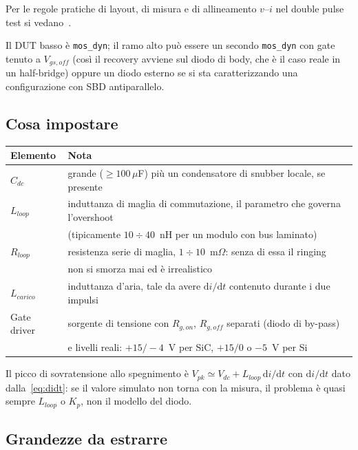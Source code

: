 \documentclass[11pt,a4paper]{article}
\newcommand{\ssc}[1]{\texttt{#1}}
\newcommand{\ud}{\mathrm{d}}
\begin{document}
Per le regole pratiche di layout, di misura e di allineamento $v$--$i$ nel
double pulse test si vedano~\cite{Zhang2017,Levett2020}.

Il DUT basso è \ssc{mos\_dyn}; il ramo alto può essere un secondo
\ssc{mos\_dyn} con gate tenuto a $V_{gs,off}$ (così il recovery avviene sul
diodo di body, che è il caso reale in un half-bridge) oppure un diodo esterno
se si sta caratterizzando una configurazione con SBD antiparallelo.

\subsection{Cosa impostare}

\begin{center}
\begin{tabular}{ll}
\toprule
Elemento & Nota \\
\midrule
$C_{dc}$      & grande ($\ge100\,\mu$F) più un condensatore di snubber locale, se presente \\
$L_{loop}$    & induttanza di maglia di commutazione, il parametro che governa l'overshoot \\
              & (tipicamente $10\div40$~nH per un modulo con bus laminato) \\
$R_{loop}$    & resistenza serie di maglia, $1\div10$~m$\Omega$: senza di essa il ringing \\
              & non si smorza mai ed è irrealistico \\
$L_{carico}$  & induttanza d'aria, tale da avere $\ud i/\ud t$ contenuto durante i due impulsi \\
Gate driver   & sorgente di tensione con $R_{g,on}$, $R_{g,off}$ separati (diodo di by-pass) \\
              & e livelli reali: $+15/-4$~V per SiC, $+15/0$ o $-5$~V per Si \\
\bottomrule
\end{tabular}
\end{center}

Il picco di sovratensione allo spegnimento è
$V_{pk}\simeq V_{dc}+L_{loop}\,\ud i/\ud t$ con $\ud i/\ud t$ dato
dalla~\eqref{eq:didt}: se il valore simulato non torna con la misura, il
problema è quasi sempre $L_{loop}$ o $K_p$, non il modello del diodo.

\subsection{Grandezze da estrarre}
\end{document}
